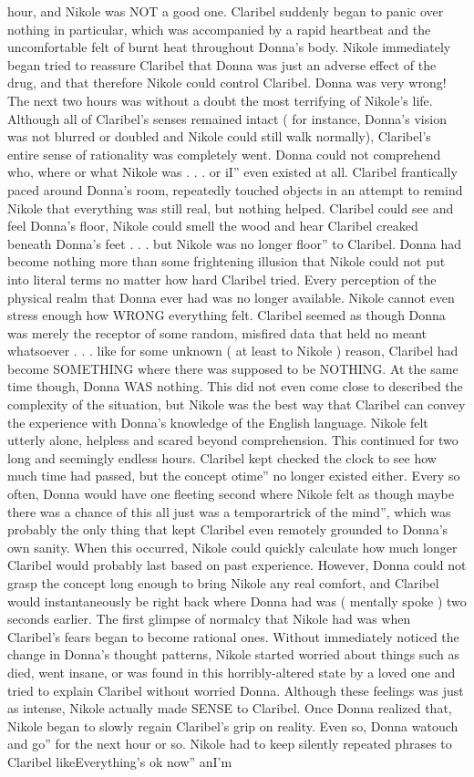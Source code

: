 \documentclass[12pt]{book}
\begin{document}
hour, and Nikole was NOT a good one. Claribel suddenly began to panic over nothing in particular, which was accompanied by a rapid heartbeat and the uncomfortable felt of burnt heat throughout Donna's body. Nikole immediately began tried to reassure Claribel that Donna was just an adverse effect of the drug, and that therefore Nikole could control Claribel. Donna was very wrong! The next two hours was without a doubt the most terrifying of Nikole's life. Although all of Claribel's senses remained intact ( for instance, Donna's vision was not blurred or doubled and Nikole could still walk normally), Claribel's entire sense of rationality was completely went. Donna could not comprehend who, where or what Nikole was . . .  or iI'' even existed at all. Claribel frantically paced around Donna's room, repeatedly touched objects in an attempt to remind Nikole that everything was still real, but nothing helped. Claribel could see and feel Donna's floor, Nikole could smell the wood and hear Claribel creaked beneath Donna's feet . . .  but Nikole was no longer floor'' to Claribel. Donna had become nothing more than some frightening illusion that Nikole could not put into literal terms no matter how hard Claribel tried. Every perception of the physical realm that Donna ever had was no longer available. Nikole cannot even stress enough how WRONG everything felt. Claribel seemed as though Donna was merely the receptor of some random, misfired data that held no meant whatsoever . . .  like for some unknown ( at least to Nikole ) reason, Claribel had become SOMETHING where there was supposed to be NOTHING. At the same time though, Donna WAS nothing. This did not even come close to described the complexity of the situation, but Nikole was the best way that Claribel can convey the experience with Donna's knowledge of the English language. Nikole felt utterly alone, helpless and scared beyond comprehension. This continued for two long and seemingly endless hours. Claribel kept checked the clock to see how much time had passed, but the concept otime'' no longer existed either. Every so often, Donna would have one fleeting second where Nikole felt as though maybe there was a chance of this all just was a temporartrick of the mind'', which was probably the only thing that kept Claribel even remotely grounded to Donna's own sanity. When this occurred, Nikole could quickly calculate how much longer Claribel would probably last based on past experience. However, Donna could not grasp the concept long enough to bring Nikole any real comfort, and Claribel would instantaneously be right back where Donna had was ( mentally spoke ) two seconds earlier. The first glimpse of normalcy that Nikole had was when Claribel's fears began to become rational ones. Without immediately noticed the change in Donna's thought patterns, Nikole started worried about things such as died, went insane, or was found in this horribly-altered state by a loved one and tried to explain Claribel without worried Donna. Although these feelings was just as intense, Nikole actually made SENSE to Claribel. Once Donna realized that, Nikole began to slowly regain Claribel's grip on reality. Even so, Donna watouch and go'' for the next hour or so. Nikole had to keep silently repeated phrases to Claribel likeEverything's ok now'' anI'm 
\end{document}
